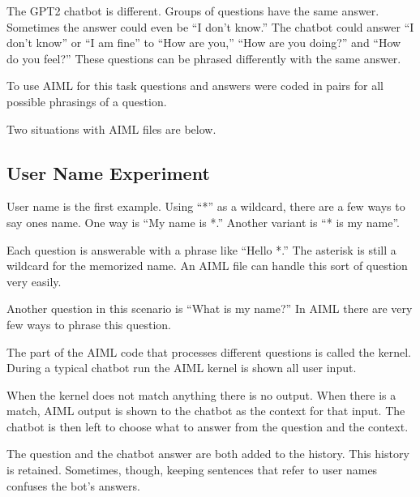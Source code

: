 The GPT2 chatbot is different. Groups of questions have the same answer. Sometimes the answer could even be ``I don't know.'' The chatbot could answer ``I don't know'' or ``I am fine'' to  ``How are you,''  ``How are you doing?'' and ``How do you feel?'' These questions can be phrased differently with the same answer.

To use AIML for this task questions and answers were coded in pairs for all possible phrasings of a question.



Two situations with AIML files are below.

\subsection{User Name Experiment}
User name is the first example. Using ``*'' as a wildcard, there are a few ways to say ones name. One way is ``My name is *.'' Another variant is ``* is my name''. %

Each question is answerable with a phrase like ``Hello *.'' The asterisk is still a wildcard for the memorized name. An AIML file can handle this sort of question very easily. 

Another question in this scenario is ``What is my name?'' In AIML there are very few ways to phrase this question. 

The part of the AIML code that processes different questions is called the kernel.
During a typical chatbot run the AIML kernel is shown all user input.%

When the kernel does not match anything there is no output. When there is a match, AIML output is shown to the chatbot as the context for that input. 
The chatbot is then left to choose what to answer from the question and the context. 

The question and the chatbot answer are both added to the history. 
This history is retained. 
Sometimes, though, keeping sentences that refer to user names confuses the bot's answers.%

